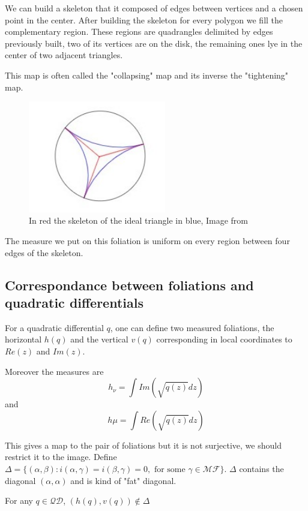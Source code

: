 We can build a skeleton that it composed of edges between vertices and a chosen point in the center. After building the skeleton for every polygon we fill the complementary region. These regions are quadrangles delimited by edges previously built, two of its vertices are on the disk, the remaining ones lye in the center of two adjacent triangles.

This map is often called the "collapsing" map and its inverse the "tightening" map.
%
\begin{figure}[h!]
\centering
\includegraphics[width=6cm]{Image/CollapsingTightening.jpg}
\caption{In red the skeleton of the ideal triangle in blue, Image from \cite{wright2018mirzakhani}}
\end{figure}

The measure we put on this foliation is uniform on every region between four edges of the skeleton.
\subsection{Correspondance between foliations and quadratic differentials}

For a quadratic differential $q$, one can define two measured foliations, the horizontal $h(q)$ and the vertical $v(q)$ corresponding in local coordinates to $Re(z)$ and $Im(z)$.

Moreover the measures are \[
h_{\nu} = \int Im(\sqrt{q(z)}dz)
\]
and \[
h{\mu} = \int Re(\sqrt{q(z)}dz)
\]

 This gives a map to the pair of foliations but it is not surjective, we should restrict it to the image.
Define $\Delta = \{(\alpha,\beta):i(\alpha,\gamma)=i(\beta,\gamma)=0, \text{ for some }\gamma \in \mathcal{MF}\}$. $\Delta$ contains the diagonal $(\alpha,\alpha)$ and is kind of "fat" diagonal.

\begin{lem}
For any $q \in \mathcal{QD}$, $(h(q),v(q)) \notin \Delta$
\end{lem}

